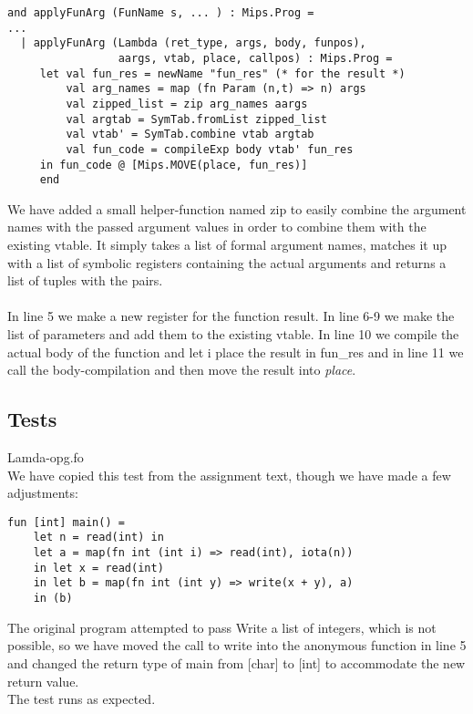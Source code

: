 \documentclass{article}
\begin{document}
\begin{lstlisting}
and applyFunArg (FunName s, ... ) : Mips.Prog =
...
  | applyFunArg (Lambda (ret_type, args, body, funpos),
                 aargs, vtab, place, callpos) : Mips.Prog =
     let val fun_res = newName "fun_res" (* for the result *)
         val arg_names = map (fn Param (n,t) => n) args
         val zipped_list = zip arg_names aargs
         val argtab = SymTab.fromList zipped_list
         val vtab' = SymTab.combine vtab argtab
         val fun_code = compileExp body vtab' fun_res            
     in fun_code @ [Mips.MOVE(place, fun_res)]
     end
\end{lstlisting}
\noindent We have added a small helper-function named zip to easily combine the argument names with the passed argument values in order to combine them with the existing vtable. It simply takes a list of formal argument names, matches it up with a list of symbolic registers containing the actual arguments and returns a list of tuples with the pairs.\\
\\
\noindent In line 5 we make a new register for the function result. In line 6-9 we make the list of parameters and add them to the existing vtable. In line 10 we compile the actual body of the function and let i place the result in fun\_res and in line 11 we call the body-compilation and then move the result into \textit{place}.

\subsection{Tests}

Lamda-opg.fo\\
We have copied this test from the assignment text, though we have made a few adjustments:
\begin{lstlisting}
fun [int] main() = 
	let n = read(int) in 
	let a = map(fn int (int i) => read(int), iota(n)) 
	in let x = read(int) 
	in let b = map(fn int (int y) => write(x + y), a) 
	in (b)
\end{lstlisting}
\noindent The original program attempted to pass Write a list of integers, which is not possible, so we have moved the call to write into the anonymous function in line 5 and changed the return type of main from [char] to [int] to accommodate the new return value.\\
The test runs as expected.

\newpage
\end{document}
